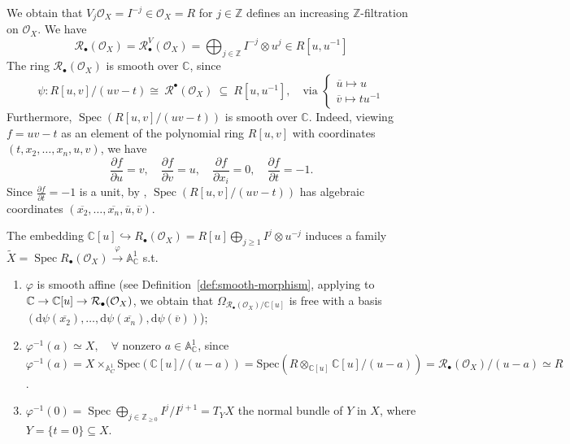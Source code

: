 We obtain that $V_{j} \mathcal{O}_X = I^{-j} \in \mathcal{O}_X = R$ for $j \in \mathbb{Z}$ defines an increasing $\mathbb{Z}$-filtration on $\mathcal{O}_X$.
We have
$$\mathcal{R}_{\bullet}(\mathcal{O}_X) = \mathcal{R}^V_{\bullet}(\mathcal{O}_X) = \bigoplus_{j \in \mathbb{Z}} I^{-j} \otimes u^j \in R[u, u^{-1}]$$
The ring $\mathcal{R}_{\bullet}(\mathcal{O}_X)$ is smooth over $\mathbb{C}$, since
\[
    \psi:R[u,v]/(uv-t) \cong\ \mathcal R^\bullet(\mathcal{O}_X)\ \subseteq\ R[u,u^{-1}], \quad \text{via }
    \begin{cases} \overline{u} \mapsto u \\ \overline{v} \mapsto tu^{-1} \end{cases}
\]
Furthermore, $\operatorname{Spec}(R[u,v]/(uv-t))$ is smooth over $\mathbb{C}$. Indeed, viewing $f = uv - t$ as an element of the polynomial ring $R[u,v]$ with coordinates $(t, x_2, \ldots, x_n, u, v)$, we have
\[
    \frac{\partial f}{\partial u} = v, \quad \frac{\partial f}{\partial v} = u, \quad \frac{\partial f}{\partial x_i} = 0, \quad \frac{\partial f}{\partial t} = -1.
\]
Since $\frac{\partial f}{\partial t} = -1$ is a unit, by \cite[\href{https://stacks.math.columbia.edu/tag/00T7}{Tag 00T7}]{stacks-project}, $\operatorname{Spec}(R[u,v]/(uv-t))$ has algebraic coordinates $(\overline{x_2}, \ldots, \overline{x_n}, \overline{u}, \overline{v})$.

\medskip

The embedding $\mathbb{C}[u] \hookrightarrow R_{\bullet}(\mathcal{O}_X)=R[u]\bigoplus\limits_{j\ge 1}I^{j}\otimes u^{-j}$ induces a family $\widetilde{X}= \operatorname{Spec} R_{\bullet}(\mathcal{O}_X)\xrightarrow{\varphi}\mathbb{A}^{1}_{\mathbb{C}}$ s.t.
\begin{enumerate}
    \item $\varphi$ is smooth affine (see Definition~\ref{def:smooth-morphism}, applying \cite[\href{https://stacks.math.columbia.edu/tag/00RS}{Tag 00RS}]{stacks-project} to $\mathbb{C} \to \mathbb{C}[u] \to \mathcal{R}_{\bullet}(\mathcal{O}_X)$, we obtain that $\Omega_{\mathcal{R}_{\bullet}(\mathcal{O}_X)/\mathbb{C}[u]}$ is free with a basis $(\mathrm{d}\psi(\overline{x_2}), \ldots, \mathrm{d}\psi(\overline{x_n}), \mathrm{d}\psi(\overline{v}))$);
    \item  $\varphi^{-1}(a) \simeq X, \quad \forall \text{ nonzero } a \in \mathbb{A}^1_{\mathbb{C}}$, since $\varphi ^{-1}(a)=X\times_{\mathbb{A}^{1}_{C}}\mathrm{Spec}(\mathbb{C}[u] /(u-a))=\mathrm{Spec}(R\otimes_{\mathbb{C}[u]}\mathbb{C}[u] /(u-a))=\mathcal{R}_{\bullet}(\mathcal{O}_{X}) /(u-a)\simeq R$.
    \item $\varphi^{-1}(0) = \operatorname{Spec} \bigoplus\limits_{j \in \mathbb{Z}_{\geq 0}} I^j/I^{j+1} = T_Y X$ the normal bundle of $Y$ in $X$, where $Y = \{t = 0\} \subseteq X$.

\end{enumerate}


